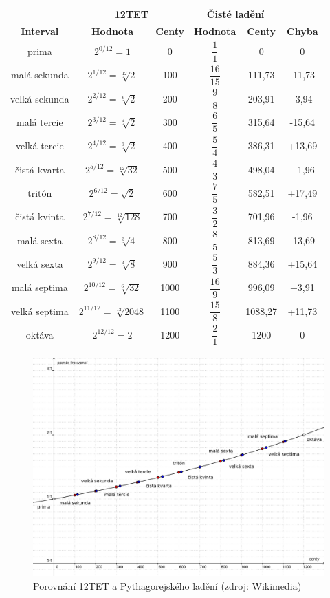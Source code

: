 \documentclass[12pt]{article}
\begin{document}
\begin{table}[p]\centering
	\begin{tabular}{ c c c c c c}
		& \multicolumn{2}{c}{\textbf{12TET}} & \multicolumn{2}{c}{\textbf{Čisté ladění}} & \\
		\textbf{Interval} & \textbf{Hodnota} & \textbf{Centy} & \textbf{Hodnota} & \textbf{Centy} & \textbf{Chyba}  \\ \hline
		prima & $2^{0/12} = 1$ & 0 & $\dfrac{1}{1}$ & 0 & 0 \\
		malá sekunda & $2^{1/12} = \sqrt[12]{2}$ & 100 & $\dfrac{16}{15}$ & 111,73 & -11,73 \\
		velká sekunda & $2^{2/12} = \sqrt[6]{2}$ & 200 & $\dfrac{9}{8}$ & 203,91 & -3,94 \\
		malá tercie & $2^{3/12} = \sqrt[4]{2}$ & 300 & $\dfrac{6}{5}$ & 315,64 & -15,64 \\
		velká tercie & $2^{4/12} = \sqrt[3]{2}$ & 400 & $\dfrac{5}{4}$ & 386,31& +13,69 \\
		čistá kvarta & $2^{5/12} = \sqrt[12]{32}$ & 500 & $\dfrac{4}{3}$ & 498,04 & +1,96 \\
		tritón & $2^{6/12} = \sqrt{2}$ & 600 & $\dfrac{7}{5}$ & 582,51 & +17,49 \\
		čistá kvinta & $2^{7/12} = \sqrt[12]{128}$ & 700 & $\dfrac{3}{2}$ & 701,96 & -1,96 \\
		malá sexta & $2^{8/12} = \sqrt[3]{4}$ & 800 & $\dfrac{8}{5}$ & 813,69 & -13,69 \\
		velká sexta & $2^{9/12} = \sqrt[4]{8}$ & 900 & $\dfrac{5}{3}$ & 884,36 & +15,64 \\
		malá septima & $2^{10/12} = \sqrt[6]{32}$ & 1000 & $\dfrac{16}{9}$ & 996,09 & +3,91 \\
		velká septima & $2^{11/12} = \sqrt[12]{2048}$ & 1100 & $\dfrac{15}{8}$ & 1088,27 & +11,73 \\
		oktáva & $2^{12/12} = 2$ & 1200 & $\dfrac{2}{1}$ & 1200 & 0 \\
	\end{tabular}
	\label{tbl:12tet_just_comparison}
\end{table}

\begin{figure}[p]\centering
	\includegraphics[width = \textwidth]{et_pyth_comparison.pdf}
	\caption{Porovnání 12TET a Pythagorejského ladění (zdroj: Wikimedia)}
	\label{fig:et_pyth_comparison}
\end{figure}

\pagebreak

{}

\end{document}
